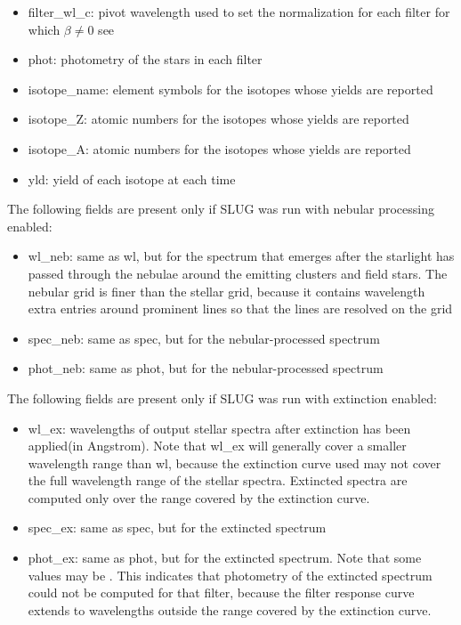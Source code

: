 \documentclass[letterpaper,10pt,english]{sphinxmanual}
\begin{document}
\begin{itemize}
\item {} 
filter\_wl\_c: pivot wavelength used to set the normalization for each filter for which \(\beta \neq 0\) \textendash{} see {\hyperref[\detokenize{intro:ssec-spec-phot}]{}}

\item {} 
phot: photometry of the stars in each filter

\item {} 
isotope\_name: element symbols for the isotopes whose yields are reported

\item {} 
isotope\_Z: atomic numbers for the isotopes whose yields are reported

\item {} 
isotope\_A: atomic numbers for the isotopes whose yields are reported

\item {} 
yld: yield of each isotope at each time

\end{itemize}

The following fields are present only if SLUG was run with nebular processing enabled:
\begin{itemize}
\item {} 
wl\_neb: same as wl, but for the spectrum that emerges after the starlight has passed through the nebulae around the emitting clusters and field stars. The nebular grid is finer than the stellar grid, because it contains wavelength extra entries around prominent lines so that the lines are resolved on the grid

\item {} 
spec\_neb: same as spec, but for the nebular-processed spectrum

\item {} 
phot\_neb: same as phot, but for the nebular-processed spectrum

\end{itemize}

The following fields are present only if SLUG was run with extinction enabled:
\begin{itemize}
\item {} 
wl\_ex: wavelengths of output stellar spectra after extinction has been applied(in Angstrom). Note that wl\_ex will generally cover a smaller wavelength range than wl, because the extinction curve used may not cover the full wavelength range of the stellar spectra. Extincted spectra are computed only over the range covered by the extinction curve.

\item {} 
spec\_ex: same as spec, but for the extincted spectrum

\item {} 
phot\_ex: same as phot, but for the extincted spectrum. Note that some values may be . This indicates that photometry of the extincted spectrum could not be computed for that filter, because the filter response curve extends to wavelengths outside the range covered by the extinction curve.

\end{itemize}
\end{document}
